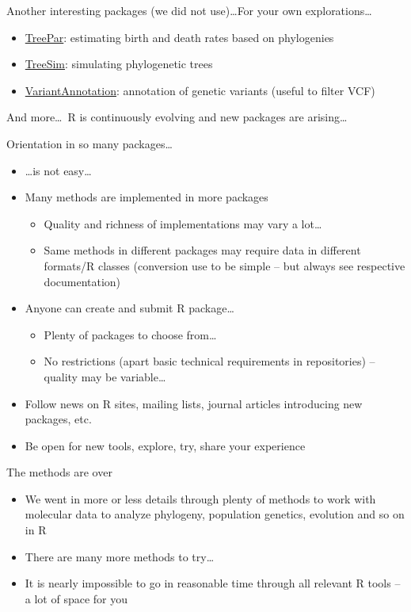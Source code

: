 \documentclass[compress, ucs, xelatex, 11pt, xcolor=svgnames,
  hyperref={
    bookmarks=true,
    unicode=true,
    colorlinks=true,
    pdftitle={Molecular data in R},
    plainpages=false,
    pdfauthor={Vojtech Zeisek},
    pdfsubject={Course about phylogeny and evolution in R},
    pdfcreator={XeLaTeX},
    pdfkeywords={R, evolution, phylogeny, molecular data},
    linkcolor=Tomato,
    anchorcolor=SaddleBrown,
    citecolor=Goldenrod,
    filecolor=DarkMagenta,
    menucolor=Sienna,
    urlcolor=DarkTurquoise,
    pdftex},
  url={hyphens, lowtilde} %
  ]{beamer}
\begin{document}
\begin{frame}[allowframebreaks]{Another interesting packages (we did not use)\ldots}{For your own explorations\ldots}
\begin{itemize}
    \item \href{https://CRAN.R-project.org/package=TreePar}{TreePar}: estimating birth and death rates based on phylogenies
    \item \href{https://CRAN.R-project.org/package=TreeSim}{TreeSim}: simulating phylogenetic trees
    \item \href{https://bioconductor.org/packages/VariantAnnotation/}{VariantAnnotation}: annotation of genetic variants (useful to filter VCF)
  \end{itemize}
  And more\ldots~R is continuously evolving and new packages are arising\ldots
\end{frame}

\begin{frame}{Orientation in so many packages\ldots}
  \begin{itemize}
    \item \ldots is not easy\ldots
    \item Many methods are implemented in more packages
    \begin{itemize}
      \item Quality and richness of implementations may vary a lot\ldots
      \item Same methods in different packages may require data in different formats/R classes (conversion use to be simple -- but always see respective documentation)
    \end{itemize}
    \item Anyone can create and submit R package\ldots
    \begin{itemize}
      \item Plenty of packages to choose from\ldots
      \item No restrictions (apart basic technical requirements in repositories) -- quality may be variable\ldots
    \end{itemize}
    \item Follow news on R sites, mailing lists, journal articles introducing new packages, etc.
    \item Be open for new tools, explore, try, share your experience
  \end{itemize}
\end{frame}

\begin{frame}{The methods are over}
  \begin{itemize}
    \item We went in more or less details through plenty of methods to work with molecular data to analyze phylogeny, population genetics, evolution and so on in R
    \item There are many more methods to try\ldots
    \item It is nearly impossible to go in reasonable time through all relevant R tools -- a lot of space for you
  \end{itemize}
\end{frame}
\end{document}
